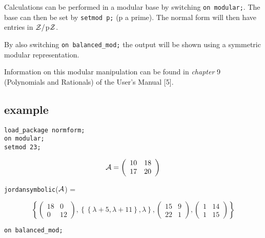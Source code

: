 Calculations can be performed in a modular base by switching {\tt on 
modular;}. The base can then be set by {\tt setmod p;} (p a prime). The 
normal form will then have entries in ${\cal Z}/$p${\cal Z}$. 

By also switching {\tt on balanced\_mod;} the output will be shown using
a symmetric modular representation. 

Information on this modular manipulation can be found in {\it chapter} 
9 (Polynomials and Rationals) of the {\REDUCE}  User's Manual [5].

\subsection{example}

{\tt load\_package normform;} \\
{\tt on modular;} \\
{\tt setmod 23;} 
\vspace{0.1in}

\begin{displaymath}
{\cal A} = \left( \begin{array}{cc} 10 & 18 \\ 17 & 20 \end{array} 
\right)
\end{displaymath}

{\tt jordansymbolic}(${\cal A}$) = 
\begin{center}
\begin{displaymath}
\left\{ \left( \begin{array}{cc} 18 & 0 \\ 0 & 12 \end{array} \right),
\left\{ \left\{ \lambda + 5, \lambda + 11  \right\}, \lambda \right\}, 
\left( \begin{array}{cc} 15 & 9 \\ 22 & 1 \end{array} \right), \left( 
\begin{array}{cc} 1 & 14 \\ 1 & 15 \end{array} \right) \right\}
\end{displaymath}
\end{center}
\vspace{0.2in}

{\tt on balanced\_mod;}
\vspace{0.2in}

